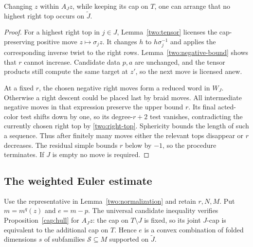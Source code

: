 \begin{lemma}
\label{two:normalization}
Changing $z$ within $A_Jz$, while keeping its cap on $T$, one can
arrange that no highest right top occurs on $\widetilde J$.
\end{lemma}
\begin{proof}
For a highest right top in $j\in J$, Lemma~\ref{two:tensor}
licenses the cap-preserving positive move $z\mapsto\sigma_jz$.
It changes $h$ to $h\sigma_j^{-1}$ and applies the corresponding
inverse twist to the right rows.  Lemma~\ref{two:negative-bound}
shows that $r$ cannot increase.  Candidate data $p,a$ are unchanged,
and the tensor products still compute the same target at $z'$, so
the next move is licensed anew.

At a fixed $r$, the chosen negative right moves form a reduced word
in $W_J$.  Otherwise a right descent could be placed last by braid
moves.  All intermediate negative moves in that expression preserve
the upper bound $r$.  Its final acted-color test shifts down by one,
so its degree-$r+2$ test vanishes, contradicting the currently chosen
right top by \eqref{two:right-top}.  Sphericity bounds the length of
such a sequence.  Thus after finitely many moves either the relevant
tops disappear or $r$ decreases.  The residual simple bounds $r$
below by $-1$, so the procedure terminates.  If $J$ is empty no move
is required.
\end{proof}

\subsection{The weighted Euler estimate}

Use the representative in Lemma~\ref{two:normalization} and retain
$r,N,M$.  Put $m=m^q(z)$ and $e=m-p$.  The universal candidate
inequality verifies Proposition~\ref{cap:hull} for $A_Jz$: the cap
on $T\setminus J$ is fixed, so its joint $J$-cap is equivalent to
the additional cap on $T$.  Hence $e$ is a convex combination of
folded dimensions $s$ of subfamilies $\mathcal S\subseteq M$
supported on $\widetilde J$.

